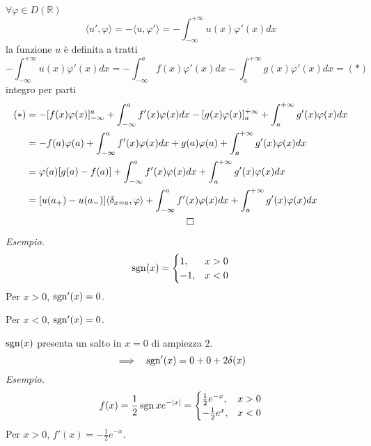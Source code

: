 $\forall \varphi \in D(\mathbb{R})$
\begin{equation*}
\langle u',\varphi \rangle =-\langle u,\varphi '\rangle =-\int ^{+\infty }_{-\infty } u( x) \varphi '( x) dx
\end{equation*}
la funzione $u$ è definita a tratti
\begin{equation*}
-\int ^{+\infty }_{-\infty } u( x) \varphi '( x) dx=-\int ^{a}_{-\infty } f( x) \varphi '( x) dx-\int ^{+\infty }_{a} g( x) \varphi '( x) dx=( *)
\end{equation*}
integro per parti
\begin{gather*}
\begin{aligned}
( *) & =-[ f( x) \varphi ( x)]^{a}_{-\infty } +\int ^{a}_{-\infty } f'( x) \varphi ( x) dx-[ g( x) \varphi ( x)]^{+\infty }_{a} +\int ^{+\infty }_{a} g'( x) \varphi ( x) dx\\
 & =-f( a) \varphi ( a) +\int ^{a}_{-\infty } f'( x) \varphi ( x) dx+g( a) \varphi ( a) +\int ^{+\infty }_{a} g'( x) \varphi ( x) dx\\
 & =\varphi ( a)[ g( a) -f( a)] +\int ^{a}_{-\infty } f'( x) \varphi ( x) dx+\int ^{+\infty }_{a} g'( x) \varphi ( x) dx\\
 & =[ u( a_{+}) -u( a_{-})] \langle \delta _{x=a} ,\varphi \rangle +\int ^{a}_{-\infty } f'( x) \varphi ( x) dx+\int ^{+\infty }_{a} g'( x) \varphi ( x) dx
\end{aligned}\\
\qed 
\end{gather*}
\textit{Esempio.}
\begin{equation*}
\operatorname{sgn}( x) =\begin{cases}
1, & x >0\\
-1, & x< 0
\end{cases}
\end{equation*}
Per $x >0$, $\operatorname{sgn} '( x) =0$.

Per $x< 0$, $\operatorname{sgn} '( x) =0$.

$\operatorname{sgn}( x)$ presenta un salto in $x=0$ di ampiezza $2$.
\begin{equation*}
\implies \ \ \operatorname{sgn} '( x) =0+0+2\delta ( x)
\end{equation*}
\textit{Esempio.}
\begin{equation*}
f( x) =\frac{1}{2}\operatorname{sgn} xe^{-| x| } =\begin{cases}
\frac{1}{2} e^{-x} , & x >0\\
-\frac{1}{2} e^{x} , & x< 0
\end{cases}
\end{equation*}
Per $x >0$, $f'( x) =-\frac{1}{2} e^{-x}$.

